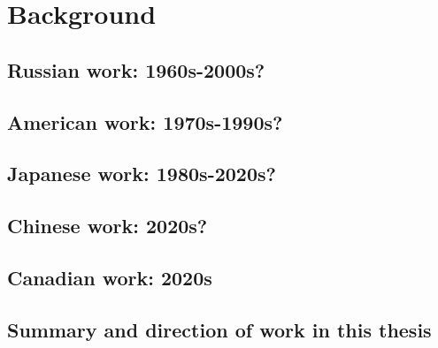 \chapter{Background} \label{chp:background}
    \section{Russian work: 1960s-2000s?}
    \section{American work: 1970s-1990s?}
    \section{Japanese work: 1980s-2020s?}
    \section{Chinese work: 2020s?}
    \section{Canadian work: 2020s}
    \section{Summary and direction of work in this thesis}

